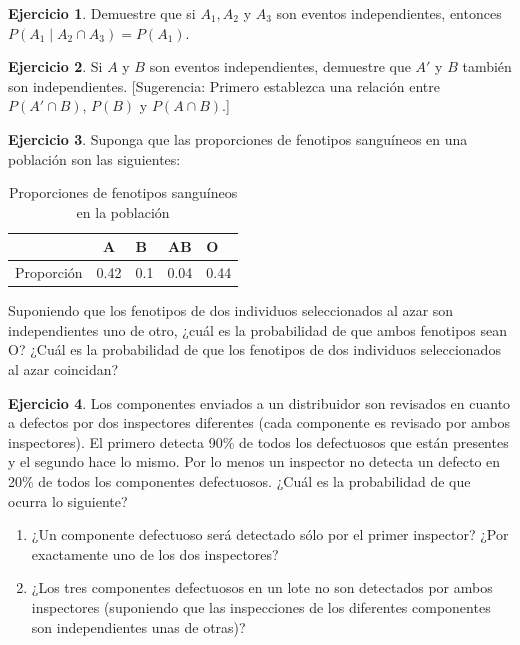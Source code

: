 \documentclass[
  11pt,
]{book}
\theoremstyle{definition}
\theoremstyle{definition}
\theoremstyle{definition}
\newtheorem{exercise}{Ejercicio}[chapter]
\theoremstyle{definition}
\theoremstyle{remark}
\begin{document}
\begin{exercise}
Demuestre que si \(A_1, A_2\) y \(A_3\) son eventos independientes, entonces \(P(A_1 \mid A_2 \cap A_3) = P(A_1)\).
\end{exercise}

\begin{exercise}
Si \(A\) y \(B\) son eventos independientes, demuestre que \(A'\) y \(B\) también son independientes. {[}Sugerencia: Primero establezca una relación entre \(P(A' \cap B)\), \(P(B)\) y \(P(A \cap B)\).{]}
\end{exercise}

\begin{exercise}
Suponga que las proporciones de fenotipos sanguíneos en una población son las siguientes:

\begin{table}[H]
\centering
\caption{\label{tab:unnamed-chunk-27}Proporciones de fenotipos sanguíneos en la población}
\centering
\begin{tabular}[t]{lclcl}
\toprule
\textbf{} & \textbf{A} & \textbf{B} & \textbf{AB} & \textbf{O}\\
\midrule
Proporción & 0.42 & 0.1 & 0.04 & 0.44\\
\bottomrule
\end{tabular}
\end{table}

Suponiendo que los fenotipos de dos individuos seleccionados al azar son independientes uno de otro, ¿cuál es la probabilidad de que ambos fenotipos sean O? ¿Cuál es la probabilidad de que los fenotipos de dos individuos seleccionados al azar coincidan?
\end{exercise}

\begin{exercise}

Los componentes enviados a un distribuidor son revisados en cuanto a defectos por dos inspectores diferentes (cada componente es revisado por ambos inspectores). El primero detecta 90\% de todos los defectuosos que están presentes y el segundo hace lo mismo. Por lo menos un inspector no detecta un defecto en 20\% de todos los componentes defectuosos. ¿Cuál es la probabilidad de que ocurra lo siguiente?

\begin{enumerate}
\def\labelenumi{\alph{enumi}.}
\item
  ¿Un componente defectuoso será detectado sólo por el primer inspector? ¿Por exactamente uno de los dos inspectores?
\item
  ¿Los tres componentes defectuosos en un lote no son detectados por ambos inspectores (suponiendo que las inspecciones de los diferentes componentes son independientes unas de otras)?\\
\end{enumerate}

\end{exercise}
\end{document}
